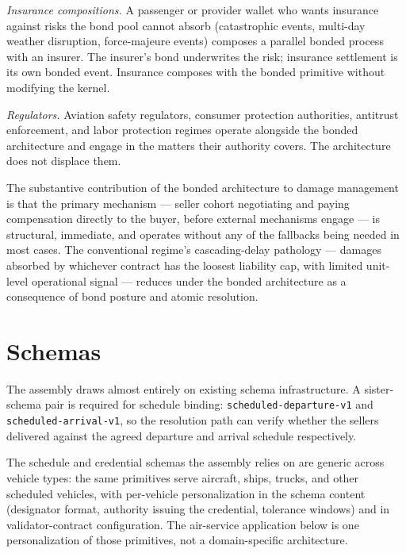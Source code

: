 \documentclass[11pt,a4paper]{article}
\theoremstyle{definition}
\theoremstyle{remark}
\begin{document}
\emph{Insurance compositions.} A passenger or provider wallet
who wants insurance against risks the bond pool cannot absorb
(catastrophic events, multi-day weather disruption, force-majeure
events) composes a parallel bonded process with an insurer. The
insurer's bond underwrites the risk; insurance settlement is its
own bonded event. Insurance composes with the bonded primitive
without modifying the kernel.

\emph{Regulators.} Aviation safety regulators, consumer protection
authorities, antitrust enforcement, and labor protection regimes
operate alongside the bonded architecture and engage in the
matters their authority covers. The architecture does not
displace them.

The substantive contribution of the bonded architecture to damage
management is that the primary mechanism --- seller cohort
negotiating and paying compensation directly to the buyer, before
external mechanisms engage --- is structural, immediate, and
operates without any of the fallbacks being needed in most cases.
The conventional regime's cascading-delay pathology --- damages
absorbed by whichever contract has the loosest liability cap,
with limited unit-level operational signal
\citep{lan_clarke_barnhart_2006} --- reduces under the bonded
architecture as a consequence of bond posture and atomic
resolution.

\section{Schemas}
\label{sec:schemas}

The assembly draws almost entirely on existing schema
infrastructure. A sister-schema pair is required for schedule
binding: \texttt{scheduled-departure-v1} and
\texttt{scheduled-arrival-v1}, so the resolution path can verify
whether the sellers delivered against the agreed departure and
arrival schedule respectively.

The schedule and credential schemas the assembly relies on are
generic across vehicle types: the same primitives serve aircraft,
ships, trucks, and other scheduled vehicles, with per-vehicle
personalization in the schema content (designator format,
authority issuing the credential, tolerance windows) and in
validator-contract configuration. The air-service application
below is one personalization of those primitives, not a
domain-specific architecture.
\end{document}
